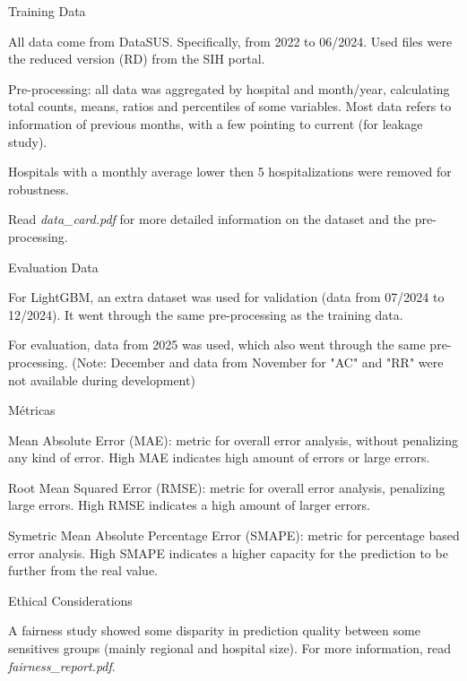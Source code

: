 \documentclass{article}
\begin{document}
\begin{singlespace}
\begin{tcolorbox}[title=\textbf{Model Card},
    breakable, sharp corners, boxrule=0.7pt]
{\begin{mcsection}{Training Data}
    \item All data come from DataSUS. Specifically, from 2022 to 06/2024. Used files were the reduced version (RD) from the SIH portal.
    \item Pre-processing: all data was aggregated by hospital and month/year, calculating total counts, means, ratios and percentiles of some variables. Most data refers to information of previous months, with a few pointing to current (for leakage study).
    \item Hospitals with a monthly average lower then 5 hospitalizations were removed for robustness.
    \item Read \textit{data\_card.pdf} for more detailed information on the dataset and the pre-processing.
\end{mcsection}

\begin{mcsection}{Evaluation Data}
    \item For LightGBM, an extra dataset was used for validation (data from 07/2024 to 12/2024). It went through the same pre-processing as the training data.
    \item For evaluation, data from 2025 was used, which also went through the same pre-processing. (Note: December and data from November for "AC" and "RR" were not available during development)
\end{mcsection}

\begin{mcsection}{Métricas}
    \item Mean Absolute Error (MAE): metric for overall error analysis, without penalizing any kind of error. High MAE indicates high amount of errors or large errors.
    \item Root Mean Squared Error (RMSE): metric for overall error analysis, penalizing large errors. High RMSE indicates a high amount of larger errors.
    \item Symetric Mean Absolute Percentage Error (SMAPE): metric for percentage based error analysis. High SMAPE indicates a higher capacity for the prediction to be further from the real value.
\end{mcsection}

\begin{mcsection}{Ethical Considerations}
    \item A fairness study showed some disparity in prediction quality between some sensitives groups (mainly regional and hospital size). For more information, read \textit{fairness\_report.pdf}.
\end{mcsection}

}
\end{tcolorbox}
\end{singlespace}
\end{document}
